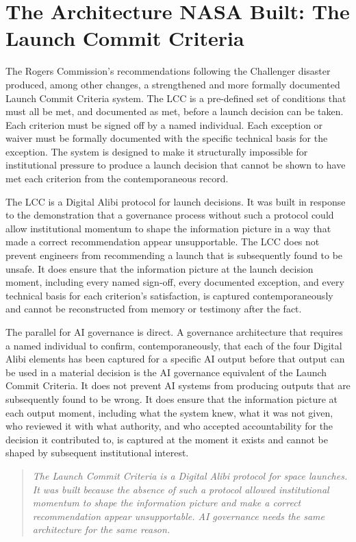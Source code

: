 \scenebreak

\section{The Architecture NASA Built: The Launch Commit Criteria}

The Rogers Commission's recommendations following the Challenger disaster produced, among other changes, a strengthened and more formally documented Launch Commit Criteria system. The LCC is a pre-defined set of conditions that must all be met, and documented as met, before a launch decision can be taken. Each criterion must be signed off by a named individual. Each exception or waiver must be formally documented with the specific technical basis for the exception. The system is designed to make it structurally impossible for institutional pressure to produce a launch decision that cannot be shown to have met each criterion from the contemporaneous record.

The LCC is a Digital Alibi protocol for launch decisions. It was built in response to the demonstration that a governance process without such a protocol could allow institutional momentum to shape the information picture in a way that made a correct recommendation appear unsupportable. The LCC does not prevent engineers from recommending a launch that is subsequently found to be unsafe. It does ensure that the information picture at the launch decision moment, including every named sign-off, every documented exception, and every technical basis for each criterion's satisfaction, is captured contemporaneously and cannot be reconstructed from memory or testimony after the fact.

The parallel for AI governance is direct. A governance architecture that requires a named individual to confirm, contemporaneously, that each of the four Digital Alibi elements has been captured for a specific AI output before that output can be used in a material decision is the AI governance equivalent of the Launch Commit Criteria. It does not prevent AI systems from producing outputs that are subsequently found to be wrong. It does ensure that the information picture at each output moment, including what the system knew, what it was not given, who reviewed it with what authority, and who accepted accountability for the decision it contributed to, is captured at the moment it exists and cannot be shaped by subsequent institutional interest.

\begin{quote}
\emph{The Launch Commit Criteria is a Digital Alibi protocol for space launches. It was built because the absence of such a protocol allowed institutional momentum to shape the information picture and make a correct recommendation appear unsupportable. AI governance needs the same architecture for the same reason.}
\end{quote}

